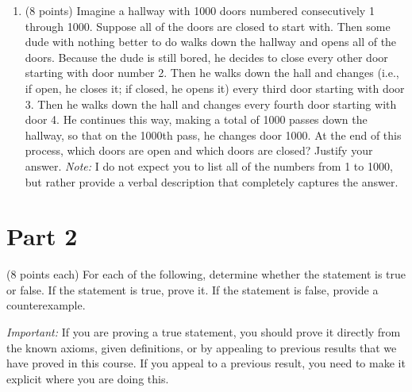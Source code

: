 \documentclass[11pt]{article}
\theoremstyle{definition}
\begin{document}
\begin{enumerate}
\vfill

\item (8 points) Imagine a hallway with 1000 doors numbered consecutively 1 through 1000.  Suppose all of the doors are closed to start with.  Then some dude with nothing better to do walks down the hallway and opens all of the doors.  Because the dude is still bored, he decides to close every other door starting with door number 2.  Then he walks down the hall and changes (i.e., if open, he closes it; if closed, he opens it) every third door starting with door 3.  Then he walks down the hall and changes every fourth door starting with door 4.  He continues this way, making a total of 1000 passes down the hallway, so that on the 1000th pass, he changes door 1000.  At the end of this process, which doors are open and which doors are closed?  Justify your answer.  \emph{Note:}  I do not expect you to list all of the numbers from 1 to 1000, but rather provide a verbal description that completely captures the answer.

\vfill

\end{enumerate}

\newpage

\section*{Part 2}

(8 points each) For each of the following, determine whether the statement is true or false.  If the statement is true, prove it.  If the statement is false, provide a counterexample.

\bigskip

\emph{Important:}  If you are proving a true statement, you should prove it directly from the known axioms, given definitions, or by appealing to previous results that we have proved in this course.  If you appeal to a previous result, you need to make it explicit where you are doing this.
\end{document}
